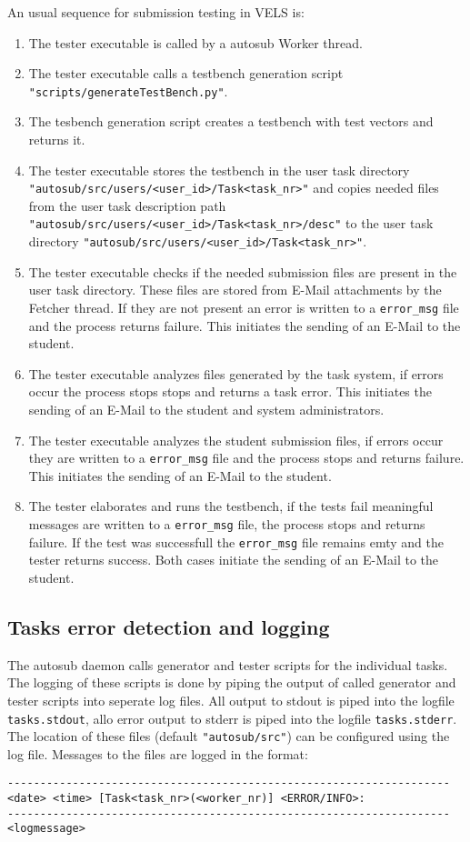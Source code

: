 An usual sequence for submission testing in VELS is:
\begin{enumerate}
\item The tester executable is called by a autosub Worker thread.
\item The tester executable calls a testbench generation script
    {\tt "scripts/generateTestBench.py"}.
\item The tesbench generation script creates a testbench with test vectors and returns it.
\item The tester executable stores the testbench in the user task directory 
	{\tt "autosub/src/users/<user\_id>/Task<task\_nr>"} and copies needed files from the user task
    description path {\tt "autosub/src/users/<user\_id>/Task<task\_nr>/desc"} to the user task directory 
	{\tt"autosub/src/users/<user\_id>/Task<task\_nr>"}.
\item The tester executable checks if the needed submission files are present in the
	user task directory. These files are stored from E-Mail attachments by the Fetcher thread. If they are
	not present an error is written to a {\tt error\_msg} file and the process returns failure. This initiates
	the sending of an E-Mail to the student.
\item The tester executable analyzes files generated by the task system, if errors
    occur the process stops stops and returns a task error. This initiates the sending of an E-Mail to the student 
	and system administrators.
\item The tester executable analyzes the student submission files, if errors occur they
    are written to a {\tt error\_msg} file and the process stops and returns failure. This initiates
	the sending of an E-Mail to the student.
\item The tester elaborates and runs the testbench, if the tests fail meaningful messages
    are written to a {\tt error\_msg} file, the process stops and returns failure. If the test was successfull the 
	{\tt error\_msg} file remains emty and the tester returns success. Both cases initiate
	the sending of an E-Mail to the student.

\end{enumerate}

\subsection{Tasks error detection and logging} \label{tasklog}
The autosub daemon calls generator and tester scripts for the individual tasks. The logging 
of these scripts is done by piping the output of called generator and tester scripts into 
seperate log files. All output to stdout is piped into the logfile {\tt tasks.stdout}, allo 
error output to stderr is piped into the logfile {\tt tasks.stderr}. The location of these
files (default {\tt "autosub/src"}) can be configured using the log file. Messages to the 
files are logged in the format:
\begin{verbatim}
--------------------------------------------------------------------
<date> <time> [Task<task_nr>(<worker_nr)] <ERROR/INFO>:
--------------------------------------------------------------------
<logmessage>
\end{verbatim}

